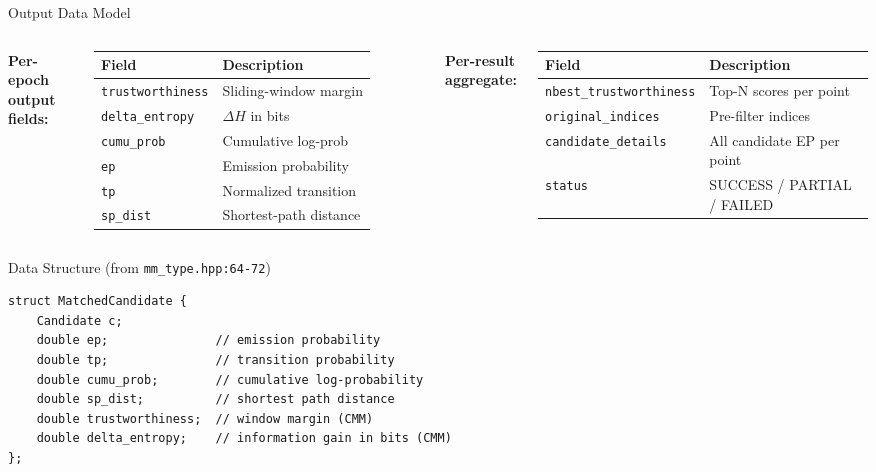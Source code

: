 \documentclass[10pt,aspectratio=169]{beamer}
\begin{document}
\begin{frame}{Output Data Model}
  \begin{columns}[T]
      \textbf{Per-epoch output fields:}
      \vspace{0.2cm}

      \begin{tabular}{lp{3.2cm}}
        \toprule
        Field & Description \\
        \midrule
        \texttt{trustworthiness} & Sliding-window margin\\
        \texttt{delta\_entropy}   & $\Delta H$ in bits\\
        \texttt{cumu\_prob}       & Cumulative log-prob\\
        \texttt{ep}               & Emission probability\\
        \texttt{tp}               & Normalized transition\\
        \texttt{sp\_dist}         & Shortest-path distance\\
        \bottomrule
      \end{tabular}

      \textbf{Per-result aggregate:}
      \vspace{0.2cm}

      \begin{tabular}{lp{3.0cm}}
        \toprule
        Field & Description \\
        \midrule
        \texttt{nbest\_trustworthiness} & Top-N scores per point\\
        \texttt{original\_indices} & Pre-filter indices\\
        \texttt{candidate\_details} & All candidate EP per point\\
        \texttt{status} & SUCCESS / PARTIAL / FAILED\\
        \bottomrule
      \end{tabular}
  \end{columns}

  \vspace{0.5cm}
  \begin{block}{Data Structure (from \texttt{mm\_type.hpp:64-72})}
    \begin{lstlisting}[basicstyle=\ttfamily\footnotesize]
struct MatchedCandidate {
    Candidate c;
    double ep;               // emission probability
    double tp;               // transition probability
    double cumu_prob;        // cumulative log-probability
    double sp_dist;          // shortest path distance
    double trustworthiness;  // window margin (CMM)
    double delta_entropy;    // information gain in bits (CMM)
};
    \end{lstlisting}
  \end{block}
\end{frame}
\end{document}
